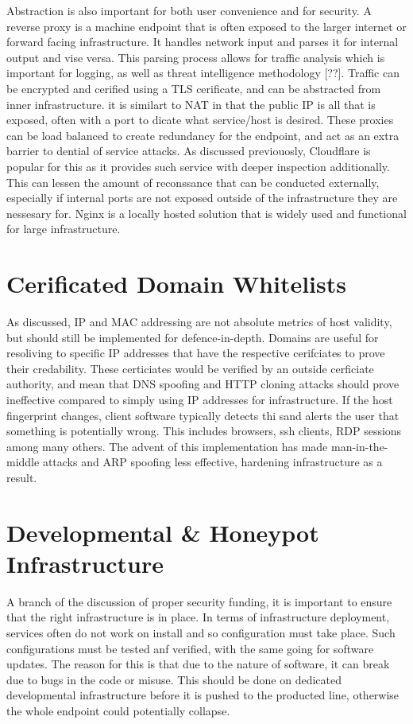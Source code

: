 Abstraction is also important for both user convenience and for security. A reverse proxy is a machine endpoint that is often exposed to the larger internet or forward facing infrastructure. It handles network input and parses it for internal output and vise versa. This parsing process allows for traffic analysis which is important for logging, as well as threat intelligence methodology [??].
Traffic can be encrypted and cerified using a TLS cerificate, and can be abstracted from inner infrastructure. it is similart to NAT in that the public IP is all that is exposed, often with a port to dicate what service/host is desired. These proxies can be load balanced to create redundancy for the endpoint, and act as an extra barrier to dential of service attacks. As discussed previouosly, Cloudflare is popular for this as it provides such service with deeper inspection additionally.
This can lessen the amount of reconssance that can be conducted externally, especially if internal ports are not exposed outside of the infrastructure they are nessesary for. Nginx is a locally hosted solution that is widely used and functional for large infrastructure.


\section{Cerificated Domain Whitelists}
As discussed, IP and MAC addressing are not absolute metrics of host validity, but should still be implemented for defence-in-depth. Domains are useful for resoliving to specific IP addresses that have the respective cerifciates to prove their credability. These certiciates would be verified by an outside cerficiate authority, and mean that DNS spoofing and HTTP cloning attacks should prove ineffective compared to simply using IP addresses for infrastructure. If the host fingerprint changes, 
client software typically detects thi sand alerts the user that something is potentially wrong. This includes browsers, ssh clients, RDP sessions among many others. The advent of this implementation has made man-in-the-middle attacks and ARP spoofing less effective, hardening infrastructure as a result.

\section{Developmental & Honeypot Infrastructure}
A branch of the discussion of proper security funding, it is important to ensure that the right infrastructure is in place. In terms of infrastructure deployment, services often do not work on install and so configuration must take place. Such configurations must be tested anf verified, with the same going for software updates. The reason for this is that due to the nature of software, it can break due to bugs in the code or misuse. 
This should be done on dedicated developmental infrastructure before it is pushed to the producted line, otherwise the whole endpoint could potentially collapse.

